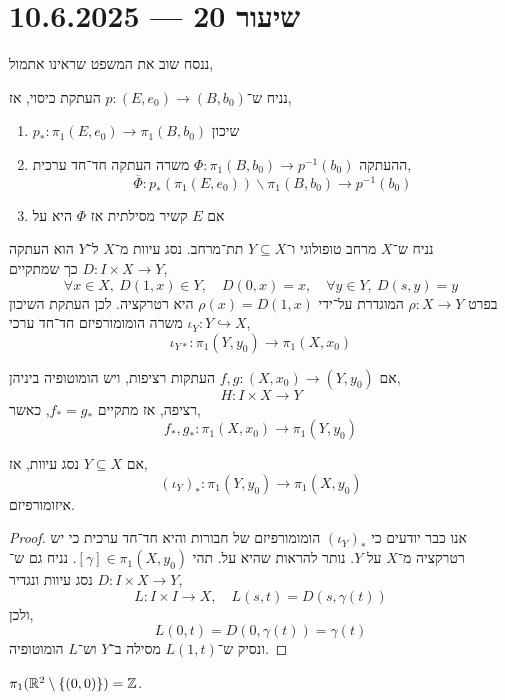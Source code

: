 \section{שיעור 20 --- 10.6.2025}
ננסח שוב את המשפט שראינו אתמול,
\begin{theorem*}
	נניח ש־$p : (E, e_0) \to (B, b_0)$ העתקת כיסוי,
	אז,
	\begin{enumerate}
		\item $p_* : \pi_1(E, e_0) \to \pi_1(B, b_0)$ שיכון
		\item ההעתקה $\Phi : \pi_1(B, b_0) \to p^{-1}(b_0)$ משרה העתקה חד־חד ערכית,
			\[
				\overline{\Phi} : p_*(\pi_1(E, e_0)) \backslash \pi_1(B, b_0) \to p^{-1}(b_0) 
			\]
		\item אם $E$ קשיר מסילתית אז $\Phi$ היא על
	\end{enumerate}
\end{theorem*}
\begin{remark}
	נניח ש־$X$ מרחב טופולוגי ו־$Y \subseteq X$ תת־מרחב.
	נסג עיוות מ־$X$ ל־$Y$ הוא העתקה $D : I \times X \to Y$ כך שמתקיים,
	\[
		\forall x \in X,\ 
		D(1, x) \in Y,
		\quad
		D(0, x) = x,
		\quad
		\forall y \in Y,\ D(s, y) = y
	\]
	בפרט $\rho : X \to Y$ המוגדרת על־ידי $\rho(x) = D(1, x)$ היא רטרקציה.
	לכן העתקת השיכון $\iota_Y : Y \hookrightarrow X$ משרה הומומורפיזם חד־חד ערכי,
	\[
		\iota_{Y *} : \pi_1(Y, y_0) \to \pi_1(X, x_0)
	\]
\end{remark}
\begin{lemma}
	אם $f, g : (X, x_0) \to (Y, y_0)$ העתקות רציפות,
	ויש הומוטופיה ביניהן,
	\[
		H : I \times X \to Y
	\]
	רציפה,
	אז מתקיים $f_* = g_*$, כאשר,
	\[
		f_*, g_* : \pi_1(X, x_0) \to \pi_1(Y, y_0)
	\]
\end{lemma}
\begin{theorem}
	אם $Y \subseteq X$ נסג עיוות,
	אז,
	\[
		{(\iota_Y)}_* : \pi_1(Y, y_0) \to \pi_1(X, y_0)
	\]
	איזומורפיזם.
\end{theorem}
\begin{proof}
	אנו כבר יודעים כי ${(\iota_Y)}_*$ הומומורפיזם של חבורות והיא חד־חד ערכית כי יש רטרקציה מ־$X$ על $Y$.
	נותר להראות שהיא על.
	תהי $[\gamma] \in \pi_1(X, y_0)$.
	נניח גם ש־$D : I \times X \to Y$ נסג עיוות ונגדיר,
	\[
		L : I \times I \to X,
		\quad
		L(s, t) = D(s, \gamma(t))
	\]
	ולכן,
	\[
		L(0, t) = D(0, \gamma(t)) = \gamma(t)
	\]
	ונסיק ש־$L(1, t)$ מסילה ב־$Y$ וש־$L$ הומוטופיה.
\end{proof}
\begin{proposition}
	$\pi_1(\mathbb{R}^2 \setminus \{ (0, 0) \}) = \mathbb{Z}$.
\end{proposition}
